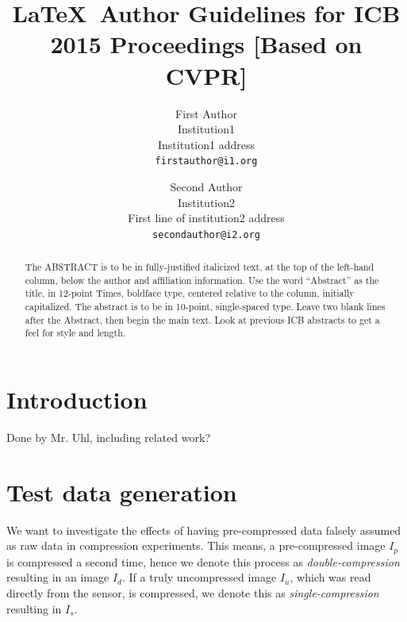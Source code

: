 \documentclass[10pt,twocolumn,letterpaper]{article}
\begin{document}
\title{\LaTeX\ Author Guidelines for ICB 2015 Proceedings [Based on CVPR]}

\author{First Author\\
Institution1\\
Institution1 address\\
{\tt\small firstauthor@i1.org}
\and
Second Author\\
Institution2\\
First line of institution2 address\\
{\tt\small secondauthor@i2.org}
}






\maketitle
\thispagestyle{empty}

\begin{abstract}
   The ABSTRACT is to be in fully-justified italicized text, at the top
   of the left-hand column, below the author and affiliation
   information. Use the word ``Abstract'' as the title, in 12-point
   Times, boldface type, centered relative to the column, initially
   capitalized. The abstract is to be in 10-point, single-spaced type.
   Leave two blank lines after the Abstract, then begin the main text.
   Look at previous ICB abstracts to get a feel for style and length. 
\end{abstract}

\section{Introduction}
Done by Mr. Uhl, including related work?

\section{Test data generation}
We want to investigate the effects of having pre-compressed data falsely assumed as raw data in compression experiments. This means, a pre-compressed image $I_p$ is compressed a second time, hence we denote this process as \emph{double-compression} resulting in an image $I_d$. If a truly uncompressed image $I_u$, which was read directly from the sensor, is compressed, we denote this as \emph{single-compression} resulting in $I_s$.
\end{document}
